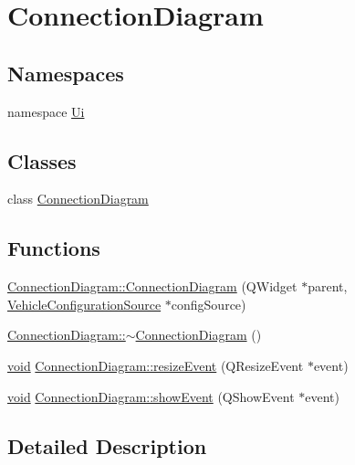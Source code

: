 \hypertarget{group___connection_diagram}{\section{Connection\-Diagram}
\label{group___connection_diagram}
}
\subsection*{Namespaces}
\begin{DoxyCompactItemize}
\item 
namespace \hyperlink{namespace_ui}{Ui}
\end{DoxyCompactItemize}
\subsection*{Classes}
\begin{DoxyCompactItemize}
\item 
class \hyperlink{class_connection_diagram}{Connection\-Diagram}
\end{DoxyCompactItemize}
\subsection*{Functions}
\begin{DoxyCompactItemize}
\item 
\hyperlink{group___connection_diagram_gac4980bbc0b4895238c2f6184739b88b9}{Connection\-Diagram\-::\-Connection\-Diagram} (Q\-Widget $\ast$parent, \hyperlink{class_vehicle_configuration_source}{Vehicle\-Configuration\-Source} $\ast$config\-Source)
\item 
\hyperlink{group___connection_diagram_gab640bd026ce6a3692e7f4cd1d7d0f907}{Connection\-Diagram\-::$\sim$\-Connection\-Diagram} ()
\item 
\hyperlink{group___u_a_v_objects_plugin_ga444cf2ff3f0ecbe028adce838d373f5c}{void} \hyperlink{group___connection_diagram_ga286bacde8e23a0b374d72fb979203bb8}{Connection\-Diagram\-::resize\-Event} (Q\-Resize\-Event $\ast$event)
\item 
\hyperlink{group___u_a_v_objects_plugin_ga444cf2ff3f0ecbe028adce838d373f5c}{void} \hyperlink{group___connection_diagram_ga53179afe974da356b81da1fea3ee75b8}{Connection\-Diagram\-::show\-Event} (Q\-Show\-Event $\ast$event)
\end{DoxyCompactItemize}


\subsection{Detailed Description}


